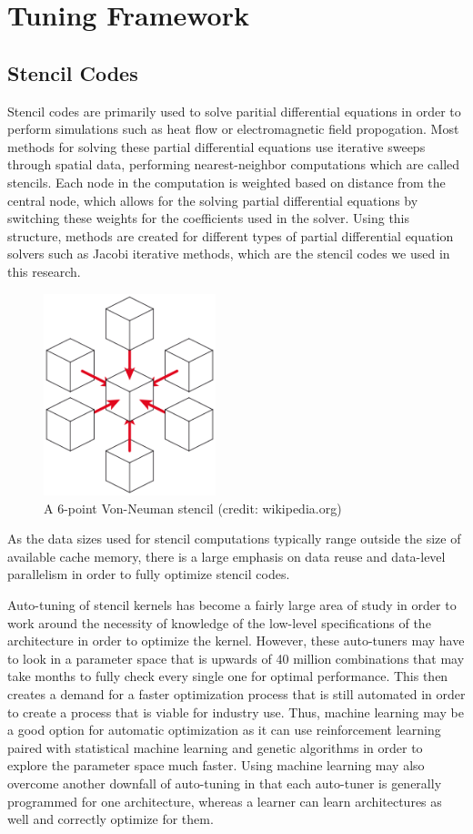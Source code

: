 \documentclass[conference]{IEEEtran}
\begin{document}
\section{Tuning Framework}
	\subsection{Stencil Codes}
	Stencil codes are primarily used to solve paritial differential equations in order to perform simulations such as heat flow or electromagnetic field propogation\cite{Datta}. Most methods for solving these partial differential equations use iterative sweeps through spatial data, performing nearest-neighbor computations which are called stencils. Each node in the computation is weighted based on distance from the central node, which allows for the solving partial differential equations by switching these weights for the coefficients used in the solver. Using this structure, methods are created for different types of partial differential equation solvers such as Jacobi iterative methods, which are the stencil codes we used in this research.

\begin{figure}[h]
	\centering
	\includegraphics[width=5cm]{stencil-7.png}
	\caption{A 6-point Von-Neuman stencil (credit: wikipedia.org)}
\end{figure}
	As the data sizes used for stencil computations typically range outside the size of available cache memory, there is a large emphasis on data reuse and data-level parallelism in order to fully optimize stencil codes.

	Auto-tuning of stencil kernels has become a fairly large area of study in order to work around the necessity of knowledge of the low-level specifications of the architecture in order to optimize the kernel. However, these auto-tuners may have to look in a parameter space that is upwards of 40 million	combinations that may take months to fully check every single one for optimal performance\cite{Datta}. This then creates a demand for a faster optimization process that is still automated in order to create a process that is viable for industry use. Thus, machine learning may be a good option for automatic optimization as it can use reinforcement learning paired with statistical machine learning and genetic algorithms in order to explore the parameter space much faster. Using machine learning may also overcome another downfall of auto-tuning in that each auto-tuner is generally programmed for one architecture, whereas a learner can learn architectures as well and correctly optimize for them.	
\end{document}
